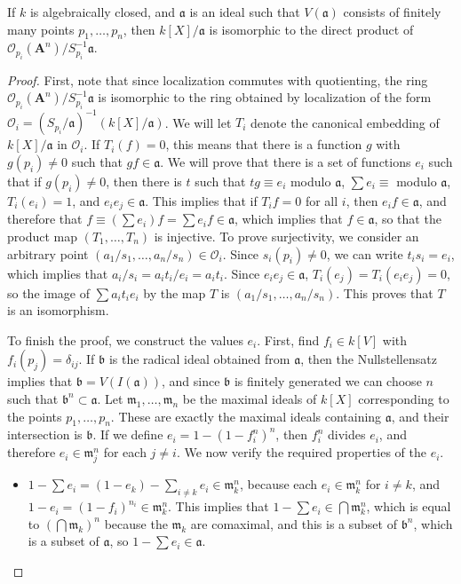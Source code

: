 \begin{theorem}
    If $k$ is algebraically closed, and $\mathfrak{a}$ is an ideal such that $V(\mathfrak{a})$ consists of finitely many points $p_1, \dots, p_n$, then $k[X]/\mathfrak{a}$ is isomorphic to the direct product of $\mathcal{O}_{p_i}(\mathbf{A}^n)/S_{p_i}^{-1} \mathfrak{a}$.
\end{theorem}
\begin{proof}
    First, note that since localization commutes with quotienting, the ring $\mathcal{O}_{p_i}(\mathbf{A}^n)/S_{p_i}^{-1} \mathfrak{a}$ is isomorphic to the ring obtained by localization of the form $\mathcal{O}_i = (S_{p_i}/\mathfrak{a})^{-1}(k[X]/\mathfrak{a})$. We will let $T_i$ denote the canonical embedding of $k[X]/\mathfrak{a}$ in $\mathcal{O}_i$. If $T_i(f) = 0$, this means that there is a function $g$ with $g(p_i) \neq 0$ such that $gf \in \mathfrak{a}$. We will prove that there is a set of functions $e_i$ such that if $g(p_i) \neq 0$, then there is $t$ such that $tg \equiv e_i$ modulo $\mathfrak{a}$, $\sum e_i \equiv $ modulo $\mathfrak{a}$, $T_i(e_i) = 1$, and $e_ie_j \in \mathfrak{a}$. This implies that if $T_if = 0$ for all $i$, then $e_if \in \mathfrak{a}$, and therefore that $f \equiv (\sum e_i)f = \sum e_if \in \mathfrak{a}$, which implies that $f \in \mathfrak{a}$, so that the product map $(T_1, \dots, T_n)$ is injective. To prove surjectivity, we consider an arbitrary point $(a_1/s_1, \dots, a_n/s_n) \in \mathcal{O}_i$. Since $s_i(p_i) \neq 0$, we can write $t_is_i = e_i$, which implies that $a_i/s_i = a_it_i/e_i = a_it_i$. Since $e_ie_j \in \mathfrak{a}$, $T_i(e_j) = T_i(e_ie_j) = 0$, so the image of $\sum a_it_ie_i$ by the map $T$ is $(a_1/s_1, \dots, a_n/s_n)$. This proves that $T$ is an isomorphism.

    To finish the proof, we construct the values $e_i$. First, find $f_i \in k[V]$ with $f_i(p_j) = \delta_{ij}$. If $\mathfrak{b}$ is the radical ideal obtained from $\mathfrak{a}$, then the Nullstellensatz implies that $\mathfrak{b} = V(I(\mathfrak{a}))$, and since $\mathfrak{b}$ is finitely generated we can choose $n$ such that $\mathfrak{b}^n \subset \mathfrak{a}$. Let $\mathfrak{m}_1, \dots, \mathfrak{m}_n$ be the maximal ideals of $k[X]$ corresponding to the points $p_1, \dots, p_n$. These are exactly the maximal ideals containing $\mathfrak{a}$, and their intersection is $\mathfrak{b}$. If we define $e_i = 1 - (1 - f_i^n)^n$, then $f_i^n$ divides $e_i$, and therefore $e_i \in \mathfrak{m}_j^n$ for each $j \neq i$. We now verify the required properties of the $e_i$.
    \begin{itemize}
        \item $1 - \sum e_i = (1 - e_k) - \sum_{i \neq k} e_i \in \mathfrak{m}_k^n$, because each $e_i \in \mathfrak{m}_k^n$ for $i \neq k$, and $1 - e_i = (1 - f_i)^{n_i} \in \mathfrak{m}_k^n$. This implies that $1 - \sum e_i \in \bigcap \mathfrak{m}_k^n$, which is equal to $(\bigcap \mathfrak{m}_k)^n$ because the $\mathfrak{m}_k$ are comaximal, and this is a subset of $\mathfrak{b}^n$, which is a subset of $\mathfrak{a}$, so $1 - \sum e_i \in \mathfrak{a}$.


\end{itemize}
\end{proof}
